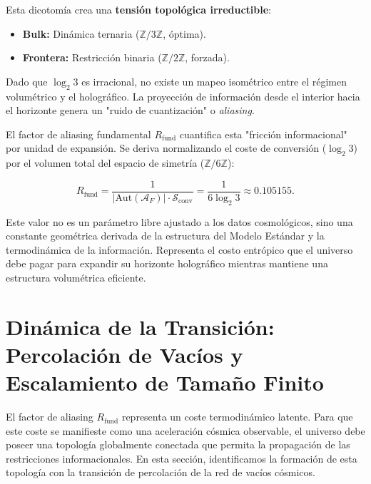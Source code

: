 \documentclass[12pt, a4paper]{article}
\theoremstyle{plain}
\theoremstyle{definition}
\begin{document}
Esta dicotomía crea una \textbf{tensión topológica irreductible}:
\begin{itemize}
    \item \textbf{Bulk:} Dinámica ternaria ($\mathbb{Z}/3\mathbb{Z}$, óptima).
    \item \textbf{Frontera:} Restricción binaria ($\mathbb{Z}/2\mathbb{Z}$, forzada).
\end{itemize}

Dado que $\log_2 3$ es irracional, no existe un mapeo isométrico entre el régimen volumétrico y el holográfico. La proyección de información desde el interior hacia el horizonte genera un "ruido de cuantización" o \textit{aliasing}. 

El factor de aliasing fundamental $R_{\text{fund}}$ cuantifica esta "fricción informacional" por unidad de expansión. Se deriva normalizando el coste de conversión ($\log_2 3$) por el volumen total del espacio de simetría ($\mathbb{Z}/6\mathbb{Z}$):

\begin{equation}
R_{\text{fund}} = \frac{1}{|\text{Aut}(\mathcal{A}_F)| \cdot \mathcal{S}_{\text{conv}}} = \frac{1}{6 \log_2 3} \approx 0.105155.
\label{eq:rfund_derivation}
\end{equation}

Este valor no es un parámetro libre ajustado a los datos cosmológicos, sino una constante geométrica derivada de la estructura del Modelo Estándar y la termodinámica de la información. Representa el costo entrópico que el universo debe pagar para expandir su horizonte holográfico mientras mantiene una estructura volumétrica eficiente.

\section{Dinámica de la Transición: Percolación de Vacíos y Escalamiento de Tamaño Finito}
\label{sec:percolacion}

El factor de aliasing $R_{\text{fund}}$ representa un coste termodinámico latente. Para que este coste se manifieste como una aceleración cósmica observable, el universo debe poseer una topología globalmente conectada que permita la propagación de las restricciones informacionales. En esta sección, identificamos la formación de esta topología con la transición de percolación de la red de vacíos cósmicos.
\end{document}

